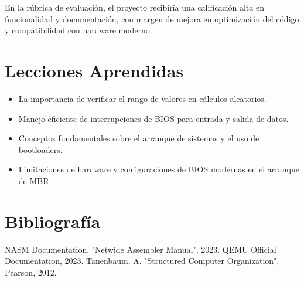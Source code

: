 \documentclass[conference]{IEEEtran}
\begin{document}
En la rúbrica de evaluación, el proyecto recibiría una calificación alta en funcionalidad y documentación, con margen de mejora en optimización del código y compatibilidad con hardware moderno.

\section{Lecciones Aprendidas}
\begin{itemize}
    \item La importancia de verificar el rango de valores en cálculos aleatorios.
    \item Manejo eficiente de interrupciones de BIOS para entrada y salida de datos.
    \item Conceptos fundamentales sobre el arranque de sistemas y el uso de bootloaders.
    \item Limitaciones de hardware y configuraciones de BIOS modernas en el arranque de MBR.
\end{itemize}

\section{Bibliografía}
\begin{thebibliography}{00}
     NASM Documentation, "Netwide Assembler Manual", 2023.
     QEMU Official Documentation, 2023.
     Tanenbaum, A. "Structured Computer Organization", Pearson, 2012.
\end{thebibliography}
\end{document}
